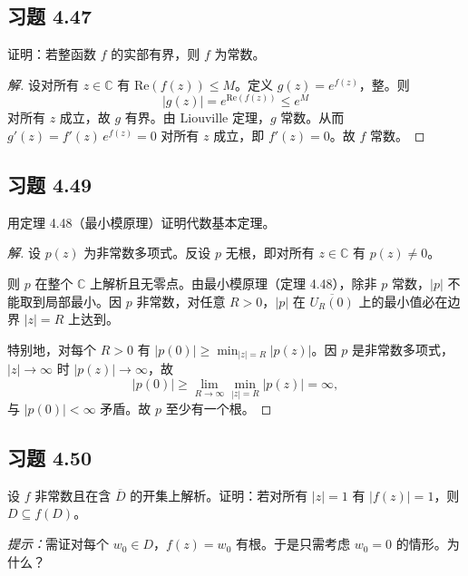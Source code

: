 \documentclass[11pt,a4paper]{article}
\newcommand{\C}{\mathbb{C}}
\renewcommand{\Re}{\mathrm{Re}}
\theoremstyle{definition}
\newenvironment{solution}{\begin{proof}[解]}{\end{proof}}
\begin{document}
\subsection{习题 4.47}

证明：若整函数 $f$ 的实部有界，则 $f$ 为常数。

\begin{solution}
  设对所有 $z \in \C$ 有 $\Re(f(z)) \le M$。定义 $g(z) = e^{f(z)}$，整。则
  \[
    |g(z)| = e^{\Re(f(z))} \le e^M
  \]
  对所有 $z$ 成立，故 $g$ 有界。由 Liouville 定理，$g$ 常数。从而 $g'(z) = f'(z)\,e^{f(z)} = 0$ 对所有 $z$ 成立，即 $f'(z) = 0$。故 $f$ 常数。
\end{solution}

\subsection{习题 4.49}

用定理 4.48（最小模原理）证明代数基本定理。

\begin{solution}
  设 $p(z)$ 为非常数多项式。反设 $p$ 无根，即对所有 $z \in \C$ 有 $p(z) \ne 0$。

  则 $p$ 在整个 $\C$ 上解析且无零点。由最小模原理（定理 4.48），除非 $p$ 常数，$|p|$ 不能取到局部最小。因 $p$ 非常数，对任意 $R > 0$，$|p|$ 在 $\overline{U_R(0)}$ 上的最小值必在边界 $|z| = R$ 上达到。

  特别地，对每个 $R > 0$ 有 $|p(0)| \ge \min_{|z|=R} |p(z)|$。因 $p$ 是非常数多项式，$|z| \to \infty$ 时 $|p(z)| \to \infty$，故
  \[
    |p(0)| \ge \lim_{R \to \infty} \min_{|z|=R} |p(z)| = \infty,
  \]
  与 $|p(0)| < \infty$ 矛盾。故 $p$ 至少有一个根。
\end{solution}

\subsection{习题 4.50}

设 $f$ 非常数且在含 $\overline{D}$ 的开集上解析。证明：若对所有 $|z| = 1$ 有 $|f(z)| = 1$，则 $D \subseteq f(D)$。

\textit{提示：}需证对每个 $w_0 \in D$，$f(z) = w_0$ 有根。于是只需考虑 $w_0 = 0$ 的情形。为什么？
\end{document}
